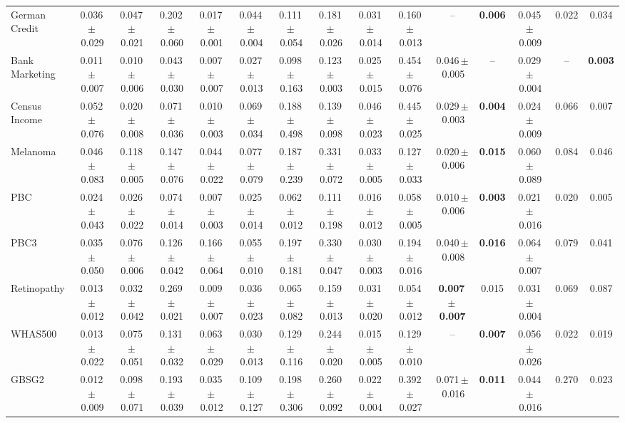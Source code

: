 \documentclass[8pt]{extarticle}
\begin{document}
\begin{longtable}{l*{14}{c}}
German Credit & 0.036\,$\pm$\,0.029 & 0.047\,$\pm$\,0.021 & 0.202\,$\pm$\,0.060 & 0.017\,$\pm$\,0.001 & 0.044\,$\pm$\,0.004 & 0.111\,$\pm$\,0.054 & 0.181\,$\pm$\,0.026 & 0.031\,$\pm$\,0.014 & 0.160\,$\pm$\,0.013 & -- & \textbf{0.006} & 0.045\,$\pm$\,0.009 & 0.022 & 0.034 \\
Bank Marketing & 0.011\,$\pm$\,0.007 & 0.010\,$\pm$\,0.006 & 0.043\,$\pm$\,0.030 & 0.007\,$\pm$\,0.007 & 0.027\,$\pm$\,0.013 & 0.098\,$\pm$\,0.163 & 0.123\,$\pm$\,0.003 & 0.025\,$\pm$\,0.015 & 0.454\,$\pm$\,0.076 & 0.046\,$\pm$\,0.005 & -- & 0.029\,$\pm$\,0.004 & -- & \textbf{0.003} \\
Census Income & 0.052\,$\pm$\,0.076 & 0.020\,$\pm$\,0.008 & 0.071\,$\pm$\,0.036 & 0.010\,$\pm$\,0.003 & 0.069\,$\pm$\,0.034 & 0.188\,$\pm$\,0.498 & 0.139\,$\pm$\,0.098 & 0.046\,$\pm$\,0.023 & 0.445\,$\pm$\,0.025 & 0.029\,$\pm$\,0.003 & \textbf{0.004} & 0.024\,$\pm$\,0.009 & 0.066 & 0.007 \\
Melanoma & 0.046\,$\pm$\,0.083 & 0.118\,$\pm$\,0.005 & 0.147\,$\pm$\,0.076 & 0.044\,$\pm$\,0.022 & 0.077\,$\pm$\,0.079 & 0.187\,$\pm$\,0.239 & 0.331\,$\pm$\,0.072 & 0.033\,$\pm$\,0.005 & 0.127\,$\pm$\,0.033 & 0.020\,$\pm$\,0.006 & \textbf{0.015} & 0.060\,$\pm$\,0.089 & 0.084 & 0.046 \\
PBC & 0.024\,$\pm$\,0.043 & 0.026\,$\pm$\,0.022 & 0.074\,$\pm$\,0.014 & 0.007\,$\pm$\,0.003 & 0.025\,$\pm$\,0.014 & 0.062\,$\pm$\,0.012 & 0.111\,$\pm$\,0.198 & 0.016\,$\pm$\,0.012 & 0.058\,$\pm$\,0.005 & 0.010\,$\pm$\,0.006 & \textbf{0.003} & 0.021\,$\pm$\,0.016 & 0.020 & 0.005 \\
PBC3 & 0.035\,$\pm$\,0.050 & 0.076\,$\pm$\,0.006 & 0.126\,$\pm$\,0.042 & 0.166\,$\pm$\,0.064 & 0.055\,$\pm$\,0.010 & 0.197\,$\pm$\,0.181 & 0.330\,$\pm$\,0.047 & 0.030\,$\pm$\,0.003 & 0.194\,$\pm$\,0.016 & 0.040\,$\pm$\,0.008 & \textbf{0.016} & 0.064\,$\pm$\,0.007 & 0.079 & 0.041 \\
Retinopathy & 0.013\,$\pm$\,0.012 & 0.032\,$\pm$\,0.042 & 0.269\,$\pm$\,0.021 & 0.009\,$\pm$\,0.007 & 0.036\,$\pm$\,0.023 & 0.065\,$\pm$\,0.082 & 0.159\,$\pm$\,0.013 & 0.031\,$\pm$\,0.020 & 0.054\,$\pm$\,0.012 & \textbf{0.007\,$\pm$\,0.007} & 0.015 & 0.031\,$\pm$\,0.004 & 0.069 & 0.087 \\
WHAS500 & 0.013\,$\pm$\,0.022 & 0.075\,$\pm$\,0.051 & 0.131\,$\pm$\,0.032 & 0.063\,$\pm$\,0.029 & 0.030\,$\pm$\,0.013 & 0.129\,$\pm$\,0.116 & 0.244\,$\pm$\,0.020 & 0.015\,$\pm$\,0.005 & 0.129\,$\pm$\,0.010 & -- & \textbf{0.007} & 0.056\,$\pm$\,0.026 & 0.022 & 0.019 \\
GBSG2 & 0.012\,$\pm$\,0.009 & 0.098\,$\pm$\,0.071 & 0.193\,$\pm$\,0.039 & 0.035\,$\pm$\,0.012 & 0.109\,$\pm$\,0.127 & 0.198\,$\pm$\,0.306 & 0.260\,$\pm$\,0.092 & 0.022\,$\pm$\,0.004 & 0.392\,$\pm$\,0.027 & 0.071\,$\pm$\,0.016 & \textbf{0.011} & 0.044\,$\pm$\,0.016 & 0.270 & 0.023 \\

\end{longtable}
\end{document}
